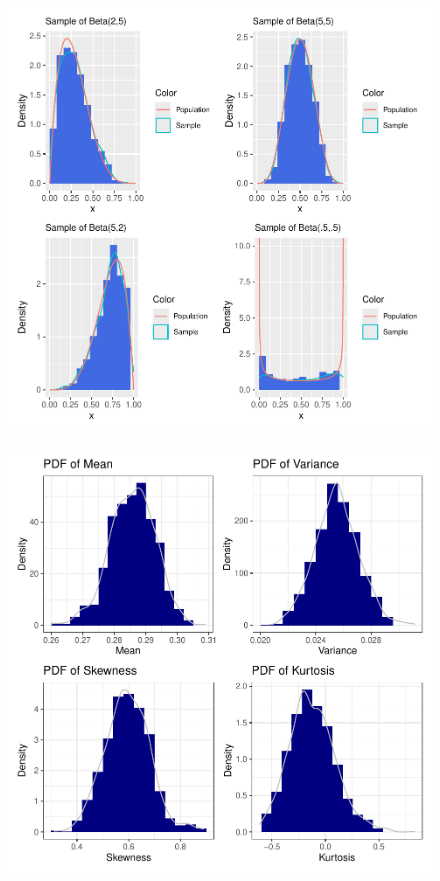 \documentclass{article}\usepackage[]{graphicx}\usepackage[]{xcolor}
\begin{document}
\begin{figure}[H]
\begin{center}
       \includegraphics[scale=0.5]{betaParam.pdf}
       \caption{}
     \label{cumStat}
     \end{center}
   \end{figure}
   \begin{figure}[H]
    \begin{center}
       \includegraphics[scale=0.5]{moments.pdf}
       \caption{}
     \label{densityf}
     \end{center}
   \end{figure}
   
\end{document}
